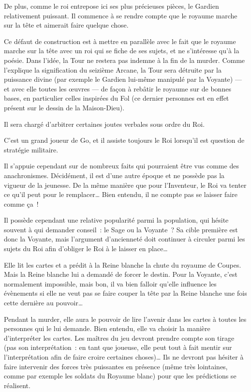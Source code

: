 {{De plus, comme le roi entrepose ici ses plus précieuses pièces, le Gardien relativement puissant.
Il commence à se rendre compte que le royaume marche sur la tête et aimerait faire quelque chose.

Ce défaut de construction est à mettre en parallèle avec le fait que le royaume marche sur la tête avec un roi qui se fiche de ses sujets, et ne s’intéresse qu’à la poésie.
Dans l’idée, la Tour ne restera pas indemne à la fin de la murder.
Comme l’explique la signification du seizième Arcane, la Tour sera détruite par la puissance divine (par exemple le Gardien lui-même manipulé par la Voyante) — et avec elle toutes les œuvres — de façon à rebâtir le royaume sur de bonnes bases, en particulier celles inspirées du Fol (ce dernier personnes est en effet présent sur le dessin de la Maison-Dieu).
}

{
Il sera chargé d’arbitrer certaines joutes verbales sous ordre du Roi.

C’est un grand joueur de Go, et il assiste toujours le Roi lorsqu’il est question de stratégie militaire.

Il s’appuie cependant sur de nombreux faits qui pourraient être vus comme des anachronismes.
Décidément, il est d’une autre époque et ne possède pas la vigueur de la jeunesse.
De la même manière que pour l’Inventeur, le Roi va tenter ce qu’il peut pour le remplacer…
Bien entendu, il ne compte pas se laisser faire comme ça~!

Il possède cependant une relative popularité parmi la population, qui hésite souvent à qui demander conseil~:  le Sage ou la Voyante~?
Sa cible première est donc la Voyante, mais l’argument d’ancienneté doit continuer à circuler parmi les sujets du Roi afin d’obliger le Roi à le laisser en place…
}

{
Elle lit les cartes et a prédit à la Reine blanche la chute du royaume de Coupes.
Mais la Reine blanche lui a demandé de forcer le destin.
Pour la Voyante, c’est normalement impossible, mais bon, il va bien falloir qu’elle influence les évènements si elle ne veut pas se faire couper la tête par la Reine blanche une fois cette dernière au pouvoir…

Pendant la murder, elle aura le pouvoir de lire l’avenir dans les cartes à toutes les personnes qui le lui demande.
Bien entendu, elle va choisir la manière d’interpréter les cartes.
Les maîtres du jeu devront prendre compte son tirage (pas son interprétation~:  en tant que joueuse, elle peut tout à fait mentir sur l’interprétation afin de faire croire certaines choses)…  Ils ne devront pas hésiter à faire intervenir des forces très puissantes en présence (même très lointaines, comme par exemple les soldats du Royaume blanc) pour que les prédictions se réalisent.

}}
